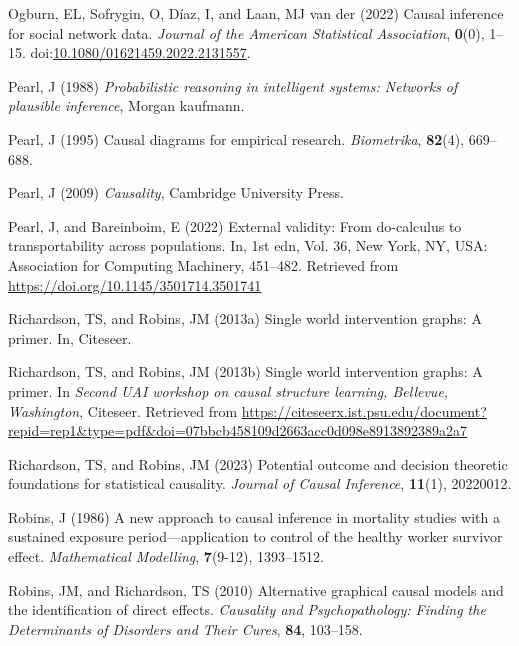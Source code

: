 \documentclass[
  single column]{article}
\newlength{\cslhangindent}
\newenvironment{CSLReferences}[2] %
 {\begin{list}{}{%
  \setlength{\itemindent}{0pt}
  \setlength{\leftmargin}{0pt}
  \setlength{\parsep}{0pt}
  \ifodd #1
   \setlength{\leftmargin}{\cslhangindent}
   \setlength{\itemindent}{-1\cslhangindent}
  \fi
  \setlength{\itemsep}{#2\baselineskip}}}
 {\end{list}}
\begin{document}
\begin{CSLReferences}{1}{0}
Ogburn, EL, Sofrygin, O, Díaz, I, and Laan, MJ van der (2022) Causal
inference for social network data. \emph{Journal of the American
Statistical Association}, \textbf{0}(0), 1--15.
doi:\href{https://doi.org/10.1080/01621459.2022.2131557}{10.1080/01621459.2022.2131557}.

Pearl, J (1988) \emph{Probabilistic reasoning in intelligent systems:
Networks of plausible inference}, Morgan kaufmann.

Pearl, J (1995) Causal diagrams for empirical research.
\emph{Biometrika}, \textbf{82}(4), 669--688.

Pearl, J (2009) \emph{Causality}, Cambridge University Press.

Pearl, J, and Bareinboim, E (2022) External validity: From do-calculus
to transportability across populations. In, 1st edn, Vol. 36, New York,
NY, USA: Association for Computing Machinery, 451--482. Retrieved from
\url{https://doi.org/10.1145/3501714.3501741}

Richardson, TS, and Robins, JM (2013a) Single world intervention graphs:
A primer. In, Citeseer.

Richardson, TS, and Robins, JM (2013b) Single world intervention graphs:
A primer. In \emph{Second UAI workshop on causal structure learning,
{B}ellevue, {W}ashington}, Citeseer. Retrieved from
\url{https://citeseerx.ist.psu.edu/document?repid=rep1&type=pdf&doi=07bbcb458109d2663acc0d098e8913892389a2a7}

Richardson, TS, and Robins, JM (2023) Potential outcome and decision
theoretic foundations for statistical causality. \emph{Journal of Causal
Inference}, \textbf{11}(1), 20220012.

Robins, J (1986) A new approach to causal inference in mortality studies
with a sustained exposure period---application to control of the healthy
worker survivor effect. \emph{Mathematical Modelling}, \textbf{7}(9-12),
1393--1512.

Robins, JM, and Richardson, TS (2010) Alternative graphical causal
models and the identification of direct effects. \emph{Causality and
Psychopathology: Finding the Determinants of Disorders and Their Cures},
\textbf{84}, 103--158.


\end{CSLReferences}
\end{document}
